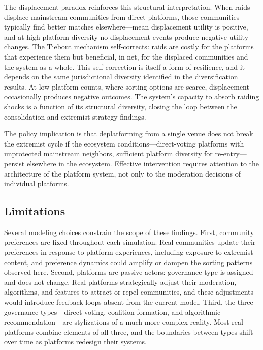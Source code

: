 \documentclass{article}
\begin{document}
The displacement paradox reinforces this structural interpretation. When raids displace mainstream communities from direct platforms, those communities typically find better matches elsewhere---mean displacement utility is positive, and at high platform diversity no displacement events produce negative utility changes. The Tiebout mechanism self-corrects: raids are costly for the platforms that experience them but beneficial, in net, for the displaced communities and the system as a whole. This self-correction is itself a form of resilience, and it depends on the same jurisdictional diversity identified in the diversification results. At low platform counts, where sorting options are scarce, displacement occasionally produces negative outcomes. The system's capacity to absorb raiding shocks is a function of its structural diversity, closing the loop between the consolidation and extremist-strategy findings.

The policy implication is that deplatforming from a single venue does not break the extremist cycle if the ecosystem conditions---direct-voting platforms with unprotected mainstream neighbors, sufficient platform diversity for re-entry---persist elsewhere in the ecosystem. Effective intervention requires attention to the architecture of the platform system, not only to the moderation decisions of individual platforms.

\subsection{Limitations}

Several modeling choices constrain the scope of these findings. First, community preferences are fixed throughout each simulation. Real communities update their preferences in response to platform experiences, including exposure to extremist content, and preference dynamics could amplify or dampen the sorting patterns observed here. Second, platforms are passive actors: governance type is assigned and does not change. Real platforms strategically adjust their moderation, algorithms, and features to attract or repel communities, and these adjustments would introduce feedback loops absent from the current model. Third, the three governance types---direct voting, coalition formation, and algorithmic recommendation---are stylizations of a much more complex reality. Most real platforms combine elements of all three, and the boundaries between types shift over time as platforms redesign their systems.
\end{document}
